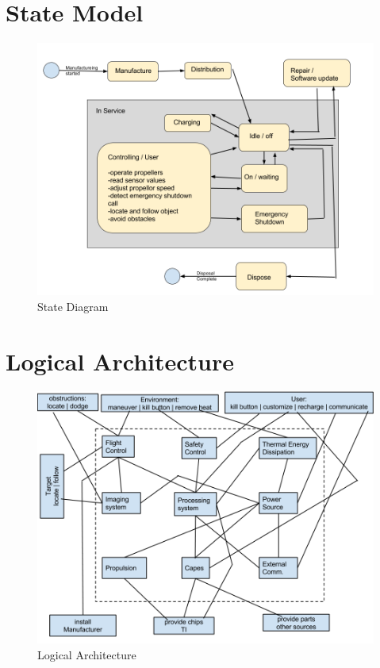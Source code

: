 \documentclass[a4paper,10pt]{scrartcl}
\begin{document}
\newpage
\section{State Model}
\begin{figure}[h]
 \centering
 \includegraphics[scale=0.5]{./StateDiagram.png}
 \caption{State Diagram}
\end{figure}


\newpage
\section{Logical Architecture}
\begin{figure}[h]
 \centering
 \includegraphics[scale=0.5]{./Logicblockdiagram.png}
 \caption{Logical Architecture}
\end{figure}
\end{document}
